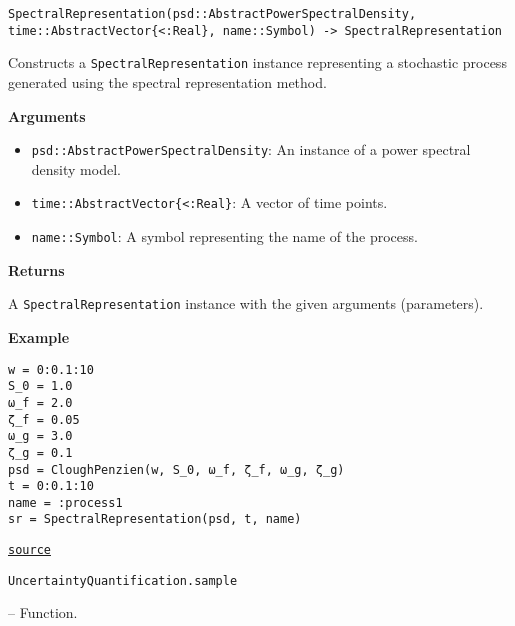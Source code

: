 \begin{adjustwidth}{2em}{0pt}


\begin{verbatim}
SpectralRepresentation(psd::AbstractPowerSpectralDensity, time::AbstractVector{<:Real}, name::Symbol) -> SpectralRepresentation
\end{verbatim}

Constructs a \texttt{SpectralRepresentation} instance representing a stochastic process generated using the spectral representation method.

\textbf{Arguments}

\begin{itemize}
\item \texttt{psd::AbstractPowerSpectralDensity}: An instance of a power spectral density model.


\item \texttt{time::AbstractVector\{<:Real\}}: A vector of time points.


\item \texttt{name::Symbol}: A symbol representing the name of the process.

\end{itemize}
\textbf{Returns}

A \texttt{SpectralRepresentation} instance with the given arguments (parameters).

\textbf{Example}


\begin{verbatim}
w = 0:0.1:10
S_0 = 1.0
ω_f = 2.0
ζ_f = 0.05
ω_g = 3.0
ζ_g = 0.1
psd = CloughPenzien(w, S_0, ω_f, ζ_f, ω_g, ζ_g)
t = 0:0.1:10
name = :process1
sr = SpectralRepresentation(psd, t, name)
\end{verbatim}



\href{https://github.com/friesischscott/UncertaintyQuantification.jl/blob/f5ee6cce729f0d6a57979257379c942cdf42f86f/src/inputs/stochasticprocesses/spectralrepresentation.jl#L13-L40}{\texttt{source}}


\end{adjustwidth}
\hypertarget{9310057082002087846}{\texttt{UncertaintyQuantification.sample}}  -- {Function.}


